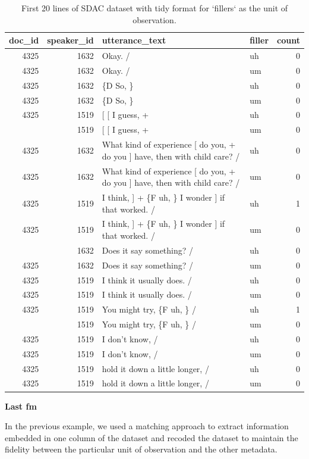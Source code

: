 \documentclass[
]{article}
\begin{document}
\begin{table}

\caption{\label{tab:td-sdac-count-disfluencies-longer-show}First 20 lines of SDAC dataset with tidy format for `fillers` as the unit of observation.}
\centering
\begin{tabular}[t]{rrllr}
\toprule
doc\_id & speaker\_id & utterance\_text & filler & count\\
\midrule
4325 & 1632 & Okay.  / & uh & 0\\
4325 & 1632 & Okay.  / & um & 0\\
4325 & 1632 & \{D So, \} & uh & 0\\
4325 & 1632 & \{D So, \} & um & 0\\
4325 & 1519 & {}[ [ I guess, + & uh & 0\\
\addlinespace
4325 & 1519 & {}[ [ I guess, + & um & 0\\
4325 & 1632 & What kind of experience [ do you, + do you ] have, then with child care? / & uh & 0\\
4325 & 1632 & What kind of experience [ do you, + do you ] have, then with child care? / & um & 0\\
4325 & 1519 & I think, ] + \{F uh, \} I wonder ] if that worked. / & uh & 1\\
4325 & 1519 & I think, ] + \{F uh, \} I wonder ] if that worked. / & um & 0\\
\addlinespace
4325 & 1632 & Does it say something? / & uh & 0\\
4325 & 1632 & Does it say something? / & um & 0\\
4325 & 1519 & I think it usually does.  / & uh & 0\\
4325 & 1519 & I think it usually does.  / & um & 0\\
4325 & 1519 & You might try, \{F uh, \}  / & uh & 1\\
\addlinespace
4325 & 1519 & You might try, \{F uh, \}  / & um & 0\\
4325 & 1519 & I don't know,  / & uh & 0\\
4325 & 1519 & I don't know,  / & um & 0\\
4325 & 1519 & hold it down a little longer,  / & uh & 0\\
4325 & 1519 & hold it down a little longer,  / & um & 0\\
\bottomrule
\end{tabular}
\end{table}

\textbf{Last fm}

In the previous example, we used a matching approach to extract information embedded in one column of the dataset and recoded the dataset to maintain the fidelity between the particular unit of observation and the other metadata.
\end{document}
